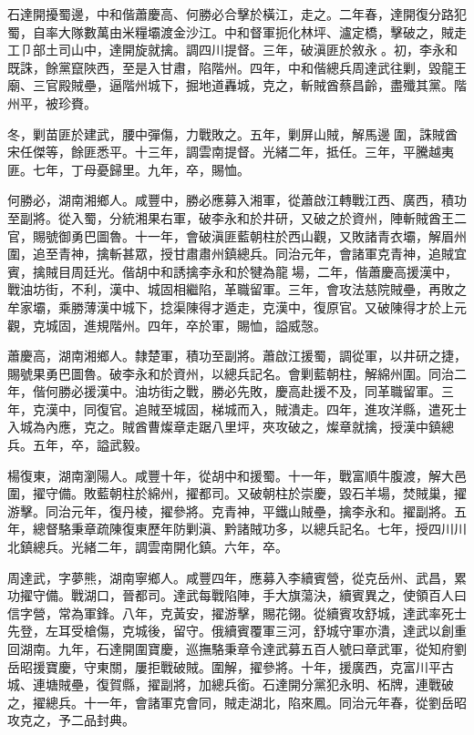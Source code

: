 \begin{pinyinscope}
石達開擾蜀邊，中和偕蕭慶高、何勝必合擊於橫江，走之。二年春，達開復分路犯蜀，自率大隊數萬由米糧壩渡金沙江。中和督軍扼化林坪、瀘定橋，擊破之，賊走工⼙部土司山中，達開旋就擒。調四川提督。三年，破滇匪於敘永。初，李永和既誅，餘黨竄陜西，至是入甘肅，陷階州。四年，中和偕總兵周達武往剿，毀龍王廟、三官殿賊壘，逼階州城下，掘地道轟城，克之，斬賊酋蔡昌齡，盡殲其黨。階州平，被珍賚。

冬，剿苗匪於建武，腰中彈傷，力戰敗之。五年，剿屏山賊，解馬邊圍，誅賊酋宋任傑等，餘匪悉平。十三年，調雲南提督。光緒二年，抵任。三年，平騰越夷匪。七年，丁母憂歸里。九年，卒，賜恤。

何勝必，湖南湘鄉人。咸豐中，勝必應募入湘軍，從蕭啟江轉戰江西、廣西，積功至副將。從入蜀，分統湘果右軍，破李永和於井研，又破之於資州，陣斬賊酋王二官，賜號御勇巴圖魯。十一年，會破滇匪藍朝柱於西山觀，又敗諸青衣壩，解眉州圍，追至青神，擒斬甚眾，授甘肅肅州鎮總兵。同治元年，會諸軍克青神，追賊宜賓，擒賊目周廷光。偕胡中和誘擒李永和於犍為龍場，二年，偕蕭慶高援漢中，戰油坊街，不利，漢中、城固相繼陷，革職留軍。三年，會攻法慈院賊壘，再敗之牟家壩，乘勝薄漢中城下，捻渠陳得才遁走，克漢中，復原官。又破陳得才於上元觀，克城固，進規階州。四年，卒於軍，賜恤，謚威愨。

蕭慶高，湖南湘鄉人。隸楚軍，積功至副將。蕭啟江援蜀，調從軍，以井研之捷，賜號果勇巴圖魯。破李永和於資州，以總兵記名。會剿藍朝柱，解綿州圍。同治二年，偕何勝必援漢中。油坊街之戰，勝必先敗，慶高赴援不及，同革職留軍。三年，克漢中，同復官。追賊至城固，梯城而入，賊潰走。四年，進攻洋縣，遣死士入城為內應，克之。賊酋曹燦章走踞八里坪，夾攻破之，燦章就擒，授漢中鎮總兵。五年，卒，謚武毅。

楊復東，湖南瀏陽人。咸豐十年，從胡中和援蜀。十一年，戰富順牛腹渡，解大邑圍，擢守備。敗藍朝柱於綿州，擢都司。又破朝柱於崇慶，毀石羊場，焚賊巢，擢游擊。同治元年，復丹棱，擢參將。克青神，平鐵山賊壘，擒李永和。擢副將。五年，總督駱秉章疏陳復東歷年防剿滇、黔諸賊功多，以總兵記名。七年，授四川川北鎮總兵。光緒二年，調雲南開化鎮。六年，卒。

周達武，字夢熊，湖南寧鄉人。咸豐四年，應募入李續賓營，從克岳州、武昌，累功擢守備。戰湖口，晉都司。達武每戰陷陣，手大旗蕩決，續賓異之，使領百人曰信字營，常為軍鋒。八年，克黃安，擢游擊，賜花翎。從續賓攻舒城，達武率死士先登，左耳受槍傷，克城後，留守。俄續賓覆軍三河，舒城守軍亦潰，達武以創重回湖南。九年，石達開圍寶慶，巡撫駱秉章令達武募五百人號曰章武軍，從知府劉岳昭援寶慶，守東關，屢拒戰破賊。圍解，擢參將。十年，援廣西，克富川平古城、連塘賊壘，復賀縣，擢副將，加總兵銜。石達開分黨犯永明、柘牌，連戰破之，擢總兵。十一年，會諸軍克會同，賊走湖北，陷來鳳。同治元年春，從劉岳昭攻克之，予二品封典。


\end{pinyinscope}
